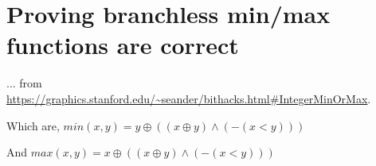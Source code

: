 \section{Proving branchless min/max functions are correct}

... from \url{https://graphics.stanford.edu/~seander/bithacks.html#IntegerMinOrMax}.

Which are, $min(x,y) = y \oplus ((x \oplus y) \wedge (-(x < y)))$

And $max(x,y) = x \oplus ((x \oplus y) \wedge (-(x < y)))$





